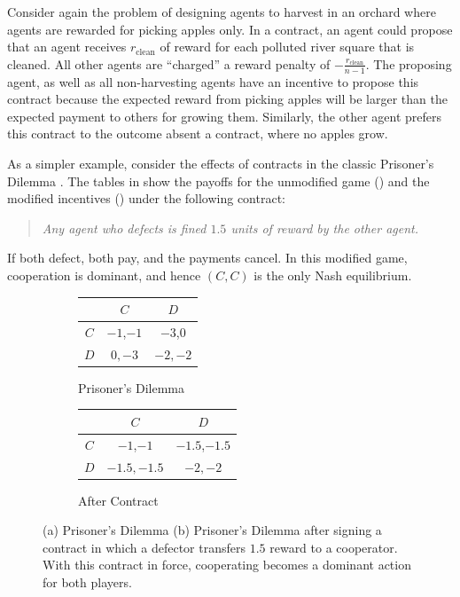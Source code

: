 \documentclass[referee,sn-basic]{sn-jnl}
\theoremstyle{thmstyleone}%
\theoremstyle{thmstyletwo}%
\theoremstyle{thmstylethree}%
\begin{document}
Consider again the problem of designing agents to harvest in an orchard where agents are rewarded for picking apples only. In a contract, an agent could propose that an agent receives $r_{\text{clean}}$ of reward for each polluted river square that is cleaned. All other agents are \enquote{charged} a reward penalty of $-\frac{r_{\text{clean}}}{n-1}$. The proposing agent, as well as all non-harvesting agents have an incentive to propose this contract because the expected reward from picking apples will be larger than the expected payment to others for growing them. Similarly, the other agent prefers this contract to the outcome absent a contract, where no apples grow.

As a simpler example, consider the effects of contracts in the classic Prisoner's Dilemma \cite{tucker1983mathematics}. The tables in  show the payoffs for the unmodified game () and the modified incentives () under the following contract: 
\begin{quote}
\emph{Any agent who defects is fined $1.5$ units of reward by the other agent.}
\end{quote}
If both defect, both pay, and the payments cancel. In this modified game, cooperation is dominant, and hence $(C,C)$ is the only Nash equilibrium.
\begin{figure}[t!]
\begin{subfigure}[b]{0.45\linewidth}
\centering
\begin{tabular}{ccc}
\toprule
& $C$ & $D$ \\
\midrule
$C$ & $-1$,$-1$ & $-3$,$0$ \\
\midrule
$D$ & $0,-3$ & $-2,-2$ \\
\bottomrule
\end{tabular}
\caption{Prisoner's Dilemma}
\label{subfig:pd}
\end{subfigure}
\begin{subfigure}[b]{0.45\linewidth}
\centering
\begin{tabular}{ccc}
\toprule
& $C$ & $D$ \\
\midrule
$C$ & $-1$,$-1$ & $-1.5$,$-1.5$ \\
\midrule
$D$ & $-1.5,-1.5$ & $-2,-2$ \\
\bottomrule
\end{tabular}
\caption{After Contract}
\label{subfig:finpd}
\end{subfigure}
\caption{
(a) Prisoner's Dilemma (b) Prisoner's Dilemma after signing a contract in which a defector transfers $1.5$ reward to a cooperator. With this contract in force, cooperating becomes a dominant action for both players.}
\label{tab:pd}
\end{figure}
\end{document}
